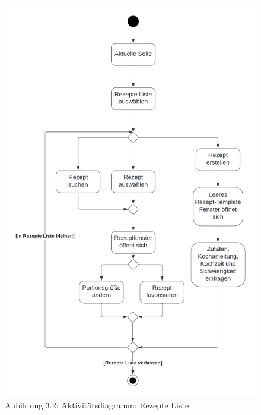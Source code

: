 \documentclass[parskip=full]{scrartcl}
\begin{document}
\begin{figure}[!htp]
    \centering
    \includegraphics{images/section3/ActivityDiagramRecipeList.png}\\
    Abbildung 3.2: Aktivitätsdiagramm: Rezepte Liste
    \label{fig:A32}
\end{figure}
\newpage
\end{document}

